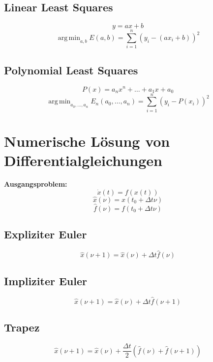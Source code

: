 \documentclass[german]{latex4ei/latex4ei_sheet}
\DeclareMathOperator*{\argmin}{arg\,min}
\begin{document}
\begin{sectionbox}
\subsection{Linear Least Squares}
\begin{equation*}
	y = a x + b
\end{equation*}
\begin{equation*}
	\argmin_{a, b} E(a, b) = \sum_{i = 1}^n \left( y_i - (a x_i + b) \right)^2
\end{equation*}

\subsection{Polynomial Least Squares}
\begin{equation*}
	P(x) = a_n x^n + \ldots + a_1 x + a_0
\end{equation*}
\begin{equation*}
	\argmin_{a_0, \ldots, a_n} E_n(a_0, \ldots, a_n) = \sum_{i = 1}^n \left( y_i - P(x_i) \right)^2
\end{equation*}
\end{sectionbox}

\section{Numerische Lösung von Differentialgleichungen}
\begin{sectionbox}
\textbf{Ausgangsproblem:}
\begin{equation*}
	\dot{x}(t) = f(x(t))
\end{equation*}
\begin{equation*}
	\hat{x}(\nu) = x(t_0 + \Delta t \nu)
\end{equation*}
\begin{equation*}
	\hat{f}(\nu) = f(t_0 + \Delta t \nu)
\end{equation*}

\subsection{Expliziter Euler}
\begin{equation*}
	\hat{x}(\nu + 1) = \hat{x}(\nu) + \Delta t \hat{f}(\nu)
\end{equation*}

\subsection{Impliziter Euler}
\begin{equation*}
	\hat{x}(\nu + 1) = \hat{x}(\nu) + \Delta t \hat{f}(\nu + 1)
\end{equation*}

\subsection{Trapez}
\begin{equation*}
	\hat{x}(\nu + 1) = \hat{x}(\nu) + \frac{\Delta t}{2} (\hat{f}(\nu) + \hat{f}(\nu + 1))
\end{equation*}
\end{sectionbox}
\end{document}
